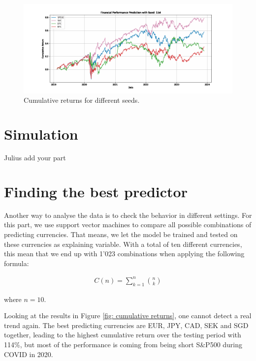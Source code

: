 \begin{figure}[h!]
  \centering
  \includegraphics[width=\linewidth]{images/financial_performance_animation.gif}
  \caption{Cumulative returns for different seeds.}
  \label{fig: moving_returns}
\end{figure}


\section{Simulation}
\label{Simulation}
Julius add your part

\section{Finding the best predictor}
\label{Finding the best predictor}
Another way to analyse the data is to check the behavior in different settings. For this part, we use support vector machines to compare all possible combinations of predicting currencies. That means, we let the model be trained and tested on these currencies as explaining variable. With a total of ten different currencies, this mean that we end up with 1'023 combinations when applying the following formula:

\begin{align}
    C(n) = \sum_{k=1}^{n} \binom{n}{k}
\end{align}

where $n=10$.

\noindent Looking at the results in Figure \ref{fig: cumulative returns}, one cannot detect a real trend again. The best predicting currencies are EUR, JPY, CAD, SEK and SGD together, leading to the highest cumulative return over the testing period with 114\%, but most of the performance is coming from being short S\&P500 during COVID in 2020. 

